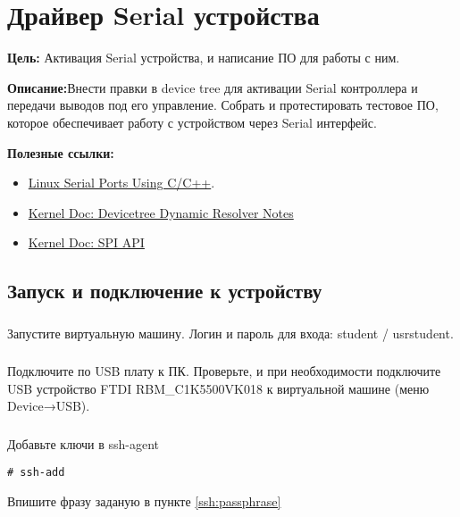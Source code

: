 \chapter{Драйвер Serial устройства}
\textbf{Цель:} Активация Serial устройства, и написание ПО для работы с ним.

\vspace{5mm}
\textbf{Описание:}Внести правки в device tree для активации Serial контроллера и передачи выводов под его управление. Собрать и протестировать тестовое ПО, которое обеспечивает работу с устройством через Serial интерфейс.

\vspace{5mm}
\textbf{Полезные ссылки:}
\begin{itemize}
	\item \href{https://blog.mbedded.ninja/programming/operating-systems/linux/linux-serial-ports-using-c-cpp/}{Linux Serial Ports Using C/C++}.
	\item \href{https://docs.kernel.org/devicetree/dynamic-resolution-notes.html}{Kernel Doc: Devicetree Dynamic Resolver Notes}
	\item \href{https://www.kernel.org/doc/html/v4.15/driver-api/spi.html}{Kernel Doc: SPI API}	
\end{itemize}

\section{Запуск и подключение к устройству}

\subsection{}Запустите виртуальную машину. Логин и пароль для входа: student / usrstudent.

\subsection{}Подключите по USB плату к ПК. Проверьте, и при необходимости подключите USB устройство FTDI RBM\_C1K5500VK018 к виртуальной машине (меню Device→USB).

\subsection{}Добавьте ключи в ssh-agent
\begin{lstlisting}[style=bash]
# ssh-add
\end{lstlisting}
Впишите фразу заданую в пункте \ref{ssh:passphrase}

